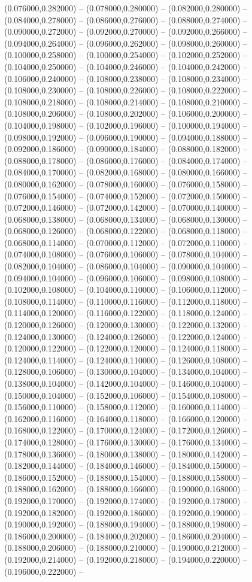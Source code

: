 (0.076000,0.282000) -- (0.078000,0.280000) -- (0.082000,0.280000) -- (0.084000,0.278000) -- (0.086000,0.276000) -- (0.088000,0.274000) -- (0.090000,0.272000) -- (0.092000,0.270000) -- (0.092000,0.266000) -- (0.094000,0.264000) -- (0.096000,0.262000) -- (0.098000,0.260000) -- (0.100000,0.258000) -- (0.100000,0.254000) -- (0.102000,0.252000) -- (0.104000,0.250000) -- (0.104000,0.246000) -- (0.104000,0.242000) -- (0.106000,0.240000) -- (0.108000,0.238000) -- (0.108000,0.234000) -- (0.108000,0.230000) -- (0.108000,0.226000) -- (0.108000,0.222000) -- (0.108000,0.218000) -- (0.108000,0.214000) -- (0.108000,0.210000) -- (0.108000,0.206000) -- (0.108000,0.202000) -- (0.106000,0.200000) -- (0.104000,0.198000) -- (0.102000,0.196000) -- (0.100000,0.194000) -- (0.098000,0.192000) -- (0.096000,0.190000) -- (0.094000,0.188000) -- (0.092000,0.186000) -- (0.090000,0.184000) -- (0.088000,0.182000) -- (0.088000,0.178000) -- (0.086000,0.176000) -- (0.084000,0.174000) -- (0.084000,0.170000) -- (0.082000,0.168000) -- (0.080000,0.166000) -- (0.080000,0.162000) -- (0.078000,0.160000) -- (0.076000,0.158000) -- (0.076000,0.154000) -- (0.074000,0.152000) -- (0.072000,0.150000) -- (0.072000,0.146000) -- (0.072000,0.142000) -- (0.070000,0.140000) -- (0.068000,0.138000) -- (0.068000,0.134000) -- (0.068000,0.130000) -- (0.068000,0.126000) -- (0.068000,0.122000) -- (0.068000,0.118000) -- (0.068000,0.114000) -- (0.070000,0.112000) -- (0.072000,0.110000) -- (0.074000,0.108000) -- (0.076000,0.106000) -- (0.078000,0.104000) -- (0.082000,0.104000) -- (0.086000,0.104000) -- (0.090000,0.104000) -- (0.094000,0.104000) -- (0.096000,0.106000) -- (0.098000,0.108000) -- (0.102000,0.108000) -- (0.104000,0.110000) -- (0.106000,0.112000) -- (0.108000,0.114000) -- (0.110000,0.116000) -- (0.112000,0.118000) -- (0.114000,0.120000) -- (0.116000,0.122000) -- (0.118000,0.124000) -- (0.120000,0.126000) -- (0.120000,0.130000) -- (0.122000,0.132000) -- (0.124000,0.130000) -- (0.124000,0.126000) -- (0.122000,0.124000) -- (0.120000,0.122000) -- (0.122000,0.120000) -- (0.124000,0.118000) -- (0.124000,0.114000) -- (0.124000,0.110000) -- (0.126000,0.108000) -- (0.128000,0.106000) -- (0.130000,0.104000) -- (0.134000,0.104000) -- (0.138000,0.104000) -- (0.142000,0.104000) -- (0.146000,0.104000) -- (0.150000,0.104000) -- (0.152000,0.106000) -- (0.154000,0.108000) -- (0.156000,0.110000) -- (0.158000,0.112000) -- (0.160000,0.114000) -- (0.162000,0.116000) -- (0.164000,0.118000) -- (0.166000,0.120000) -- (0.168000,0.122000) -- (0.170000,0.124000) -- (0.172000,0.126000) -- (0.174000,0.128000) -- (0.176000,0.130000) -- (0.176000,0.134000) -- (0.178000,0.136000) -- (0.180000,0.138000) -- (0.180000,0.142000) -- (0.182000,0.144000) -- (0.184000,0.146000) -- (0.184000,0.150000) -- (0.186000,0.152000) -- (0.188000,0.154000) -- (0.188000,0.158000) -- (0.188000,0.162000) -- (0.188000,0.166000) -- (0.190000,0.168000) -- (0.192000,0.170000) -- (0.192000,0.174000) -- (0.192000,0.178000) -- (0.192000,0.182000) -- (0.192000,0.186000) -- (0.192000,0.190000) -- (0.190000,0.192000) -- (0.188000,0.194000) -- (0.188000,0.198000) -- (0.186000,0.200000) -- (0.184000,0.202000) -- (0.186000,0.204000) -- (0.188000,0.206000) -- (0.188000,0.210000) -- (0.190000,0.212000) -- (0.192000,0.214000) -- (0.192000,0.218000) -- (0.194000,0.220000) -- (0.196000,0.222000) -- 